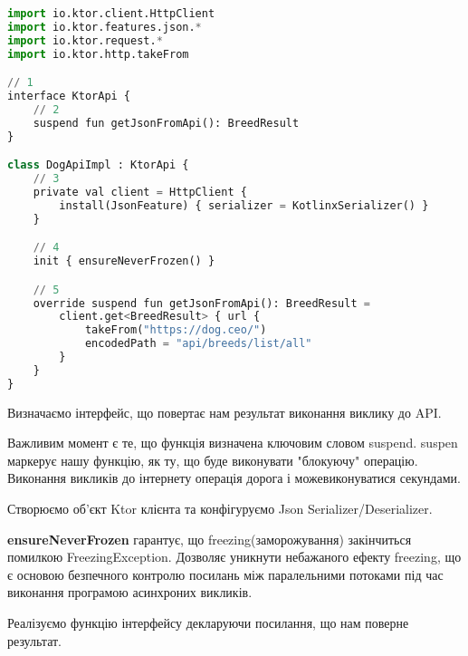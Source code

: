 \begin{lstlisting}[style=light, language=Python,label={lst:kmm_ktor},caption=Ktor]
import io.ktor.client.HttpClient
import io.ktor.features.json.*
import io.ktor.request.*
import io.ktor.http.takeFrom

// 1
interface KtorApi {
    // 2
    suspend fun getJsonFromApi(): BreedResult
}

class DogApiImpl : KtorApi {
    // 3
    private val client = HttpClient {
        install(JsonFeature) { serializer = KotlinxSerializer() }
    }

    // 4
    init { ensureNeverFrozen() }

    // 5
    override suspend fun getJsonFromApi(): BreedResult =
        client.get<BreedResult> { url {
            takeFrom("https://dog.ceo/")
            encodedPath = "api/breeds/list/all"
        }
    }
}
\end{lstlisting}

\begin{enumerate}
    \begin{item}
        Визначаємо інтерфейс, що повертає нам результат виконання виклику до API.
    \end{item}

    \begin{item}
        Важливим момент є те, що функція визначена ключовим словом suspend.
        suspen маркерує нашу функцію, як ту, що буде виконувати "блокуючу" операцію.
        Виконання викликів до інтернету операція дорога і можевиконуватися секундами.
    \end{item}

    \begin{item}
        Створюємо об'єкт Ktor клієнта та конфігуруємо Json Serializer/Deserializer.
    \end{item}

    \begin{item}
        \textbf{ensureNeverFrozen} гарантує, що freezing(заморожування) закінчиться помилкою FreezingException.
        Дозволяє уникнути небажаного ефекту freezing, що є основою безпечного контролю посилань між паралельними потоками
        під час виконання програмою асинхроних викликів.
    \end{item}

    \begin{item}
        Реалізуємо функцію інтерфейсу декларуючи посилання, що нам поверне результат.
    \end{item}

\end{enumerate}

